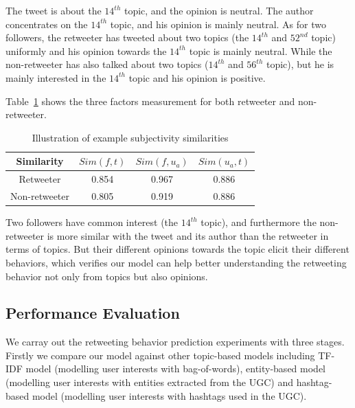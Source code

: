 \documentclass[letterpaper]{article}
\begin{document}
The tweet is about the $ 14^{th} $ topic, and the opinion is neutral.
The author concentrates on the $ 14^{th} $ topic, and his opinion is mainly neutral.
As for two followers, the retweeter has tweeted about two topics (the $ 14^{th} $ and $ 52^{nd} $ topic) uniformly 
and his opinion towards the $ 14^{th} $ topic is mainly neutral.
While the non-retweeter has also talked about two topics ($ 14^{th} $ and $ 56^{th} $ topic), but he is mainly interested in the $ 14^{th} $ topic 
and his opinion is positive.

Table~\ref{tab4} shows the three factors measurement for both retweeter and non-retweeter. 
\begin{table}[h]
\scriptsize
\centering
\caption{ Illustration of example subjectivity similarities}
\label{tab4}
\begin{tabular}{|c|c|c|c|}
\hline
Similarity & $ Sim(f,t) $ & $ Sim(f,u_a)  $ & $ Sim(u_a,t)  $\\
\hline
Retweeter & 0.854 & 0.967 & 0.886\\
\hline
Non-retweeter & 0.805 & 0.919 & 0.886\\
\hline
\end{tabular}
\end{table} 
Two followers have common interest (the $ 14^{th} $ topic), and furthermore the non-retweeter is more similar with the tweet and its author than the retweeter in terms of topics. But their different opinions towards the topic elicit their different behaviors, which verifies our model can help better understanding the retweeting behavior not only from topics but also opinions.

\subsection{Performance Evaluation}

We carray out the retweeting behavior prediction experiments with three stages. Firstly we compare our model against other topic-based models including TF-IDF model (modelling user interests with bag-of-words), entity-based model (modelling user interests with entities extracted from the UGC) and hashtag-based model (modelling user interests with hashtags used in the UGC)\cite{abel2011analyzing}. 
\end{document}
